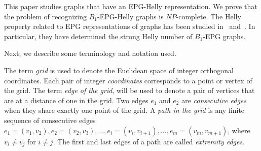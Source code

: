 \documentclass[runningheads]{llncs}
\begin{document}
%






This paper studies graphs that have an EPG-Helly representation. We prove that the problem of recognizing $ B_1$-EPG-Helly graphs is $NP$-complete.   The Helly property related to EPG representations of graphs has been studied in~\cite{golumbic2013} and~\cite{golumbic2009}. In particular, they have determined the strong Helly number of $B_1$-EPG graphs. 


 
 
 Next, we describe some terminology and notation used.


The term \emph{grid} is used to denote the Euclidean space of integer orthogonal coordinates. Each pair of integer \emph{coordinates} corresponds to a point or vertex of the grid. The term \emph{edge of the grid}, will be used to denote a pair of vertices that are at a distance of one in the grid. Two edges $e_1$ and $e_2$ are \emph{consecutive edges} when they share exactly one point of the grid. %
 A \emph{path in the grid} is any finite sequence of consecutive edges $e_1 = (v_1, v_{2}), e_2 = (v_2, v_{3}), \dots, e_i = (v_i, v_{i+1}), \dots, e_m = (v_{m}, v_{m+1})$, where $v_i \neq v_j$ for $i \neq j$. %
 The first and last edges of a path are called \emph{extremity edges}.
 
\end{document}
